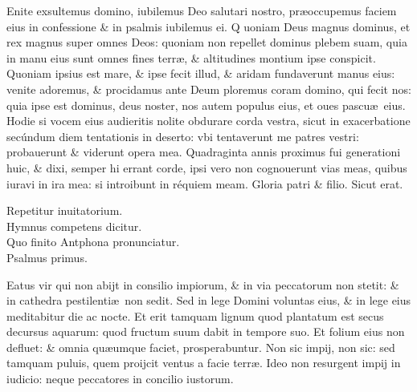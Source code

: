 \documentclass[a5paper,10pt]{book}
\def\ae{æ}
\begin{document}
\begin{multicols*}{2}
Enite exsultemus domino, iubilemus Deo salutari nostro, pr\ae occupemus faciem eius in confessione \& in psalmis iubilemus ei.
\newline
\color{red} Q\color{black}
uoniam Deus magnus dominus, et rex magnus super omnes %
Deos: quoniam non repellet dominus plebem suam, quia in manu eius sunt omnes fines terr\ae , \& altitudines montium ipse conspicit.
\newline
\color{red} Q\color{black}uoniam ipsius est mare, \& ipse fecit illud, \& aridam fundaverunt manus eius: venite adoremus, \& procidamus ante Deum ploremus coram domino, qui fecit nos: quia ipse est dominus, deus noster, nos autem populus eius, et oues pascu\ae \ eius.
\newline
\color{red} H\color{black}odie si vocem eius audieritis nolite obdurare corda vestra, sicut in exacerbatione secúndum diem tentationis in deserto: vbi tentaverunt me patres vestri: probauerunt \& viderunt opera mea.
\newline
\color{red} Q\color{black}uadraginta annis proximus fui generationi huic, \& dixi, semper hi errant corde, ipsi vero non cognouerunt vias meas, quibus iuravi in ira mea: si introibunt in réquiem meam.
\newline
\color{red} G\color{black}loria patri \& filio. Sicut erat.
\vspace{-1em}
\begin{center} \color{red}
Repetitur inuitatorium.\\
Hymnus competens dicitur.\\
Quo finito Antphona pronunciatur.\\
Psalmus primus.
\end{center}
\vspace{-1em}
Eatus vir qui non abijt in consilio impiorum, \& in via peccatorum non stetit: \& in cathedra pestilenti\ae \ non sedit.
\newline \color{red} S\color{black}ed in lege Domini voluntas eius, \& in lege eius meditabitur die ac nocte.
\newline \color{red} E\color{black}t erit tamquam lignum quod plantatum est secus decursus aquarum: quod fructum suum dabit in tempore suo.
\newline \color{red} E\color{black}t folium eius non defluet: \& omnia qu\ae umque %
faciet, prosperabuntur.
\newline \color{red} N\color{black}on sic impij, non sic: sed tamquam puluis, quem proijcit ventus a facie terr\ae .
\newline \color{red} I\color{black}deo non resurgent impij in iudicio: neque peccatores in concilio iustorum.

\end{multicols*}
\end{document}
